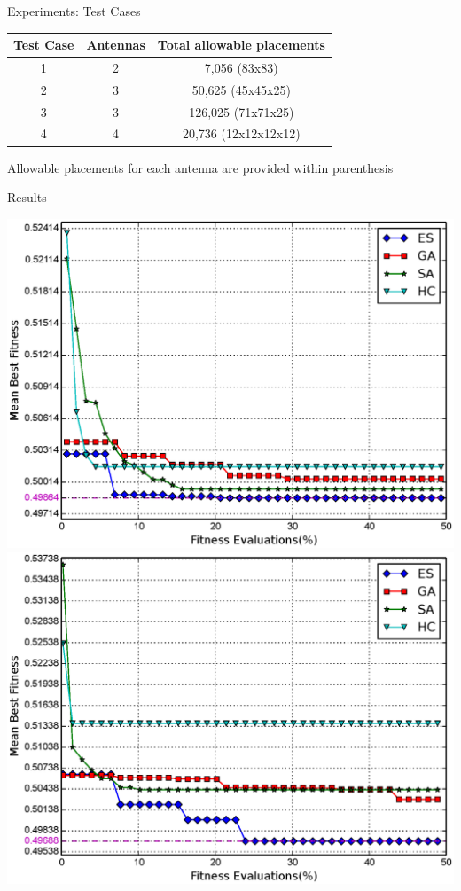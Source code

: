 \documentclass{beamer}
\begin{document}
                \begin{frame}{Experiments: Test Cases}
                    \begin{table}
                        \centering
                        \begin{tabular}{|c|c|c|} \hline
                            Test Case&Antennas&Total allowable placements\\ \hline
                            1 & 2 & 7,056 (83x83) \\ \hline
                            2 & 3 & 50,625 (45x45x25) \\ \hline
                            3 & 3 & 126,025 (71x71x25) \\ \hline
                            4 & 4 & 20,736 (12x12x12x12) \\
                            \hline\end{tabular}
                    \end{table}
                    \small *Allowable placements for each antenna are provided within parenthesis
                \end{frame}
                \begin{frame}{Results}
                    \begin{center}
                        \includegraphics[width=.49\textwidth]{../paper/FIG/tc1_mf.eps}
                        \includegraphics[width=.49\textwidth]{../paper/FIG/tc2_mf.eps}
                    \end{center}
                \end{frame}
\end{document}
